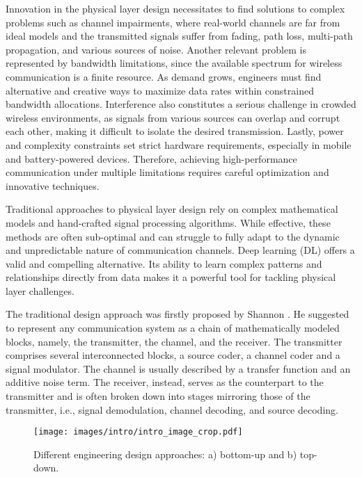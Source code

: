 Innovation in the physical layer design necessitates to find solutions to complex problems such as channel impairments, where real-world channels are far from ideal models and the transmitted signals suffer from fading, path loss, multi-path propagation, and various sources of noise. Another relevant problem is represented by bandwidth limitations, since the available spectrum for wireless communication is a finite resource. As demand grows, engineers must find alternative and creative ways to maximize data rates within constrained bandwidth allocations.
Interference also constitutes a serious challenge in crowded wireless environments, as signals from various sources can overlap and corrupt each other, making it difficult to isolate the desired transmission.
Lastly, power and complexity constraints set strict hardware requirements, especially in mobile and battery-powered devices. Therefore, achieving high-performance communication under multiple limitations requires careful optimization and innovative techniques.

Traditional approaches to physical layer design rely on complex mathematical models and hand-crafted signal processing algorithms. While effective, these methods are often sub-optimal and can struggle to fully adapt to the dynamic and unpredictable nature of communication channels. Deep learning (DL) offers a valid and compelling alternative. Its ability to learn complex patterns and relationships directly from data makes it a powerful tool for tackling physical layer challenges.

The traditional design approach was firstly proposed by Shannon \cite{Shannon1948}. He suggested to represent any communication system as a chain of mathematically modeled blocks, namely, the transmitter, the channel, and the receiver. 
The transmitter comprises several interconnected blocks, a source coder, a channel coder and a signal modulator. The channel is usually described by a transfer function and an additive noise term. The receiver, instead, serves as the counterpart to the transmitter and is often broken down into stages mirroring those of the transmitter, i.e., signal demodulation, channel decoding, and source decoding.

\begin{figure}
	\centering
	\texttt{[image: images/intro/intro\_image\_crop.pdf]}
	\caption{Different engineering design approaches: a) bottom-up and b) top-down.}
	\label{fig:intro_approach}
\end{figure}

